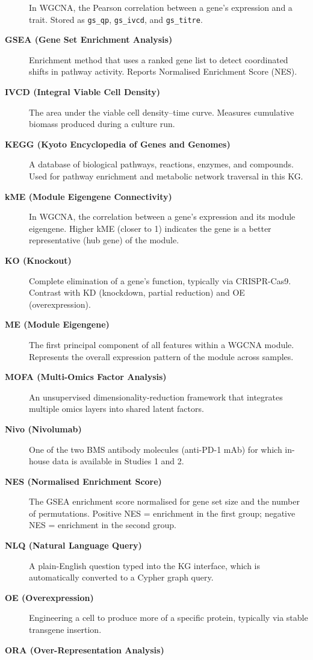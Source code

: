 \documentclass[
  letterpaper,
  oneside,
  open=any]{scrbook}
\begin{document}
\begin{description}
In WGCNA, the Pearson correlation between a gene's expression and a
trait. Stored as \texttt{gs\_qp}, \texttt{gs\_ivcd}, and
\texttt{gs\_titre}.
\item[\textbf{GSEA (Gene Set Enrichment Analysis)}]
Enrichment method that uses a ranked gene list to detect coordinated
shifts in pathway activity. Reports Normalised Enrichment Score (NES).
\item[\textbf{IVCD (Integral Viable Cell Density)}]
The area under the viable cell density--time curve. Measures cumulative
biomass produced during a culture run.
\item[\textbf{KEGG (Kyoto Encyclopedia of Genes and Genomes)}]
A database of biological pathways, reactions, enzymes, and compounds.
Used for pathway enrichment and metabolic network traversal in this KG.
\item[\textbf{kME (Module Eigengene Connectivity)}]
In WGCNA, the correlation between a gene's expression and its module
eigengene. Higher kME (closer to 1) indicates the gene is a better
representative (hub gene) of the module.
\item[\textbf{KO (Knockout)}]
Complete elimination of a gene's function, typically via CRISPR-Cas9.
Contrast with KD (knockdown, partial reduction) and OE (overexpression).
\item[\textbf{ME (Module Eigengene)}]
The first principal component of all features within a WGCNA module.
Represents the overall expression pattern of the module across samples.
\item[\textbf{MOFA (Multi-Omics Factor Analysis)}]
An unsupervised dimensionality-reduction framework that integrates
multiple omics layers into shared latent factors.
\item[\textbf{Nivo (Nivolumab)}]
One of the two BMS antibody molecules (anti-PD-1 mAb) for which in-house
data is available in Studies 1 and 2.
\item[\textbf{NES (Normalised Enrichment Score)}]
The GSEA enrichment score normalised for gene set size and the number of
permutations. Positive NES = enrichment in the first group; negative NES
= enrichment in the second group.
\item[\textbf{NLQ (Natural Language Query)}]
A plain-English question typed into the KG interface, which is
automatically converted to a Cypher graph query.
\item[\textbf{OE (Overexpression)}]
Engineering a cell to produce more of a specific protein, typically via
stable transgene insertion.
\item[\textbf{ORA (Over-Representation Analysis)}]

\end{description}
\end{document}
